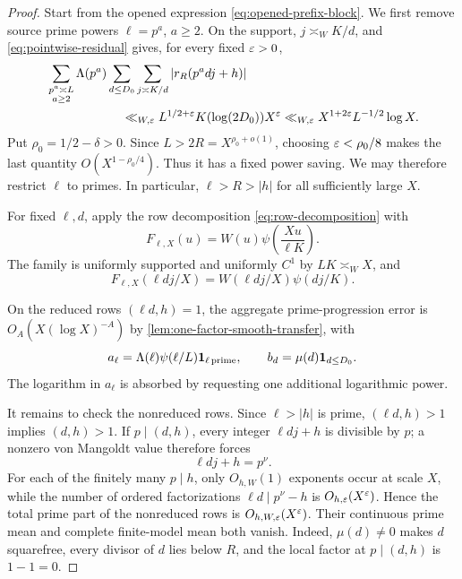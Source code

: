 \begin{proof}
Start from the opened expression \eqref{eq:opened-prefix-block}.  We
first remove source prime powers $\ell=p^a$, $a\ge2$.  On the support,
$j\asymp_W K/d$, and \eqref{eq:pointwise-residual} gives, for every
fixed $\varepsilon>0$,
\begin{align}
 &\sum_{\substack{p^a\asymp L\\a\ge2}}
 \Lambda(p^a)
 \sum_{d\le D_0}\sum_{j\asymp K/d}
 |r_R(p^adj+h)|
 \notag\\
 &\hspace{6em}\ll_{W,\varepsilon}
 L^{1/2+\varepsilon}K(\log(2D_0))X^\varepsilon
 \ll_{W,\varepsilon}X^{1+2\varepsilon}L^{-1/2}\log X.
 \label{eq:assembled-source-powers}
\end{align}
Put $\rho_0=1/2-\delta>0$.  Since
$L>2R=X^{\rho_0+o(1)}$, choosing $\varepsilon<\rho_0/8$ makes the last
quantity $O(X^{1-\rho_0/4})$.  Thus it has a fixed power saving.
We may therefore restrict $\ell$ to primes.  In particular,
$\ell>R>|h|$ for all sufficiently large $X$.

For fixed $\ell,d$, apply the row decomposition
\eqref{eq:row-decomposition} with
\begin{equation}
 F_{\ell,X}(u)
 =W(u)\psi\!\left(\frac{Xu}{\ell K}\right).
 \label{eq:assembly-row-weight}
\end{equation}
The family is uniformly supported and uniformly $C^1$ by
$LK\asymp_WX$, and
\[
 F_{\ell,X}(\ell dj/X)
 =W(\ell dj/X)\psi(dj/K).
\]

On the reduced rows $(\ell d,h)=1$, the aggregate prime-progression
error is $O_A(X(\log X)^{-A})$ by
\cref{lem:one-factor-smooth-transfer}, with
\begin{equation}
 a_\ell=\Lambda(\ell)\psi(\ell/L)\mathbf 1_{\ell\,\mathrm{prime}},
 \qquad
 b_d=\mu(d)\mathbf 1_{d\le D_0}.
 \label{eq:assembly-separated-coefficients}
\end{equation}
The logarithm in $a_\ell$ is absorbed by requesting one additional
logarithmic power.

It remains to check the nonreduced rows.  Since $\ell>|h|$ is prime,
$(\ell d,h)>1$ implies $(d,h)>1$.  If $p\mid(d,h)$, every integer
$\ell dj+h$ is divisible by $p$; a nonzero von Mangoldt value therefore
forces
\begin{equation}
 \ell dj+h=p^\nu.
 \label{eq:nonreduced-prime-power-equation}
\end{equation}
For each of the finitely many $p\mid h$, only $O_{h,W}(1)$ exponents
occur at scale $X$, while the number of ordered factorizations
$\ell d\mid p^\nu-h$ is $O_{h,\varepsilon}(X^\varepsilon)$.  Hence the total prime
part of the nonreduced rows is $O_{h,W,\varepsilon}(X^\varepsilon)$.  Their continuous
prime mean and complete finite-model mean both vanish.  Indeed,
$\mu(d)\ne0$ makes $d$ squarefree, every divisor of $d$ lies below
$R$, and the local factor at $p\mid(d,h)$ is $1-1=0$.


\end{proof}
